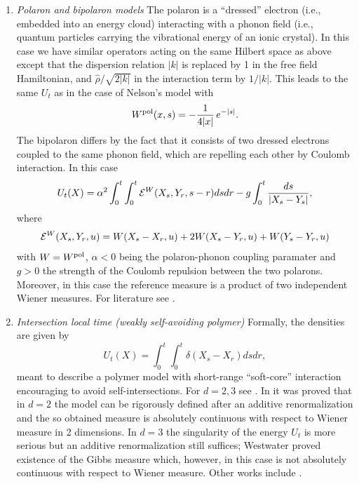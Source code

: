 \documentclass[a4paper,11pt]{article}
\begin{document}
\begin{enumerate}
\item[(3)]
{\it Polaron and bipolaron models}\quad
The polaron is a ``dressed'' electron (i.e., embedded into an energy
cloud) interacting with a phonon field (i.e., quantum particles
carrying the vibrational energy of an ionic crystal). In this case we
have similar operators acting on the same Hilbert space as above 
except that the dispersion relation $|k|$ is replaced by 1 in the
free field Hamiltonian, and $\widehat\rho/\sqrt{2|k|}$ in the 
interaction term by $1/|k|$. This leads to the same $U_t$ as in the 
case of Nelson's model with 
$$
W^{\rm\tiny{pol}}(x,s) = -\frac{1}{4|x|}\,e^{-|s|}.
$$
The bipolaron differs by the fact that it consists of two dressed
electrons coupled to the same phonon field, which are repelling each
other by Coulomb interaction. In this case 
$$
U_t(X) = \alpha^2 \int_0^t\int_0^t {\cal E}^W(X_s,Y_r,s-r) dsdr
- g\int_0^t \frac{ds}{|X_s-Y_s|},
$$
where 
$$
{\cal E}^W(X_s,Y_r,u) = W(X_s-X_r,u) + 2W(X_s-Y_r,u) + W(Y_s-Y_r,u)
$$
with $W = W^{\rm\tiny{pol}}$, $\alpha < 0$ being the polaron-phonon
coupling paramater and $g>0$ the strength of the Coulomb repulsion 
between the two polarons. Moreover, in this case the reference measure
is a product of two independent Wiener measures. For literature see
\cite{DV,S,LM06}.

\item[(4)]
{\it Intersection local time (weakly self-avoiding polymer)}\quad
Formally, the densities are given by
$$ 
U_t(X) = \int_0^t \int_0^t \delta(X_s-X_r) ds dr, 
$$ 
meant to describe a polymer model with short-range ``soft-core'' 
interaction encouraging to avoid self-intersections. For $d=2, 3$ 
see \cite{MR853758,MR667754,MR609228,MR573702,MR1240717}. In 
\cite{Symanzik:1969lr} it was proved that in $d=2$ the model can be 
rigorously defined after an additive renormalization and the so 
obtained measure is absolutely continuous with respect to Wiener measure 
in 2 dimensions. In $d=3$ the singularity of the energy $U_t$ is more 
serious but an additive renormalization still suffices; Westwater proved 
existence of the Gibbs measure which, however, in this case is not 
absolutely continuous with respect to Wiener measure. Other works 
include \cite{MR729794,MR1329112,MR889758,MR942042}.

\end{enumerate}
\end{document}
